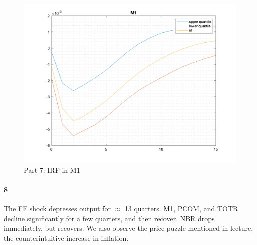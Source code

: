 \documentclass[10pt,letter]{article}
\newcommand{\problempart}[1]{\paragraph{#1}}
\begin{document}
\begin{figure}
\begin{center}
\includegraphics[width=15cm]{ps9fig7}
\caption{Part 7: IRF in M1}
\end{center}
\end{figure}

\problempart{8} The FF shock depresses output for $\approx$ 13 quarters. M1, PCOM, and TOTR decline significantly for a few quarters, and then recover. NBR drops immediately, but recovers. We also observe the price puzzle mentioned in lecture, the counterintuitive increase in inflation.
\end{document}
